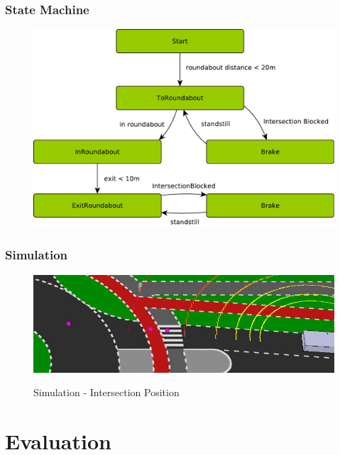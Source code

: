 \documentclass[nosymbols]{beamer}	%
\begin{document}
\begin{frame}
\frametitle{State Machine}
\begin{figure}[!ht]
\begin{center}
\includegraphics[width=\textwidth,height=0.7\textheight,keepaspectratio]{bilder/stateMachine.pdf}
\end{center}
\end{figure}
\end{frame}

\begin{frame}
\frametitle{Simulation}
\begin{figure}[!ht]
\begin{center}
\caption{Simulation - Intersection Position}
\includegraphics[width=\textwidth,height=0.7\textheight,keepaspectratio]{bilder/intersection_pos.png}
\label{obst_cases}
\end{center}
\end{figure}
\end{frame}


\section{Evaluation}
\end{document}
